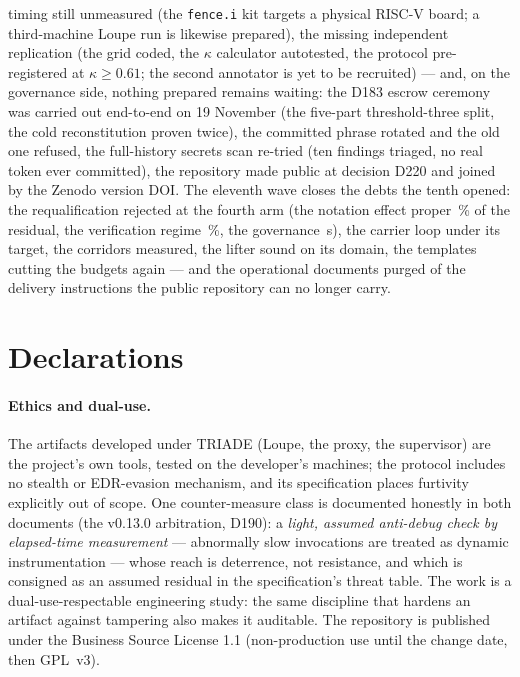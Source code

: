 \documentclass[10pt,a4paper]{article}
\newcommand{\code}[1]{\texttt{\small #1}}
\begin{document}
timing still unmeasured (the \code{fence.i} kit targets a physical RISC-V
board; a third-machine Loupe run is likewise prepared), the missing
independent replication
(the grid coded, the $\kappa$ calculator autotested, the protocol
pre-registered at $\kappa\ge0.61$; the second annotator is yet to be
recruited) --- and, on the governance side, nothing prepared remains
waiting: the D183 escrow ceremony was carried out end-to-end on 19 November
(the five-part threshold-three split, the cold reconstitution proven
twice), the committed phrase rotated and the old one refused, the
full-history secrets scan re-tried (ten findings triaged, no real
token ever committed), the repository made public at decision D220 and
joined by the Zenodo version DOI. The eleventh wave closes the debts
the tenth opened: the requalification rejected at the fourth arm (the
notation effect proper \partNotationPropre\,\% of the residual, the
verification regime \partRegime\,\%, the governance \effetGouvernanceOnze\,s),
the carrier loop under its target, the corridors measured, the lifter
sound on its domain, the templates cutting the budgets again --- and
the operational documents purged of the delivery instructions the
public repository can no longer carry.

\section*{Declarations}

\paragraph{Ethics and dual-use.} The artifacts developed under TRIADE
(Loupe, the proxy, the supervisor) are the project's own tools, tested on
the developer's machines; the protocol includes no stealth or
EDR-evasion mechanism, and its specification places furtivity explicitly
out of scope. One counter-measure class is documented honestly in both
documents (the v0.13.0 arbitration, D190): a \emph{light, assumed
anti-debug check by elapsed-time measurement} --- abnormally slow
invocations are treated as dynamic instrumentation --- whose reach is
deterrence, not resistance, and which is consigned as an assumed residual
in the specification's threat table. The work is a dual-use-respectable
engineering study: the same discipline that hardens an artifact against
tampering also makes it auditable. The repository is published under the
Business Source License 1.1 (non-production use until the change date,
then GPL~v3).
\end{document}
